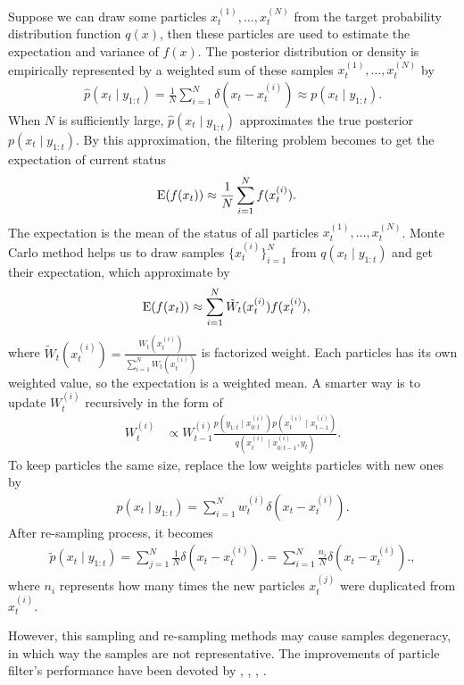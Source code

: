 Suppose we can draw some particles $x_t^{(1)}, \ldots, x_t^{(N)}$ from the target probability distribution function $q(x)$, then these particles are used to estimate the expectation and variance of $f(x)$. The posterior distribution or density is empirically represented by a weighted sum of these samples $x_t^{(1)}, \ldots, x_t^{(N)}$ by 
\begin{align*}
\hat{p}(x_t\mid y_{1:t})=\frac{1}{N}\sum_{i=1}^N\delta (x_t-x_t^{(i)})\approx p(x_t\mid y_{1:t}).
\end{align*}
When $N$ is sufficiently large, $\hat{p}(x_t\mid y_{1:t})$ approximates the true posterior $p(x_t\mid y_{1:t})$. By this approximation, the filtering problem becomes to get the expectation of current status
\begin{align*}
\mathrm{E}(f(x_t)) &\approx \frac{1}{N}\sum_{i=1}^Nf(x_t^{(i)}).
\end{align*}
The expectation is the mean of the status of all particles $x_t^{(1)}, \ldots, x_t^{(N)}$. Monte Carlo method helps us to draw samples $\{x_t^{(i)}\}_{i=1}^N$ from $q(x_t\mid y_{1:t})$ and get their expectation, which approximate by
\begin{align*}
\mathrm{E}(f(x_t)) &\approx \sum_{i=1}^{N} \tilde{W}_t(x_t^{(i)})f(x_t^{(i)}),
\end{align*}
where $\tilde{W}_t(x_t^{(i)}) = \frac{ W_t(x_t^{(i)})}{\sum_{i=1}^NW_t(x_t^{(i)})}$ is factorized weight. Each particles has its own weighted value, so the expectation is a weighted mean. A smarter way is to update $W_t^{(i)}$ recursively in the form of
\begin{align*}
W_t^{(i)} &\propto W_{t-1}^{(i)} \frac{ p(y_{1:t}\mid x_{0:t}^{(i)}) p(x_{t}^{(i)}\mid x_{t-1}^{(i)}) }   {q(x_{t}^{(i)}\mid x_{0:t-1}^{(i)},y_{t})}.
\end{align*}
To keep particles the same size, replace the low weights particles with new ones by 
\begin{align*}
p(x_t\mid y_{1:t})=\sum_{i=1}^Nw_t^{(i)} \delta (x_t-x_t^{(i)}).
\end{align*}
After re-sampling process, it becomes
\begin{align*}
\tilde{p}(x_t\mid y_{1:t})=\sum_{j=1}^N\frac{1}{N} \delta (x_t-x_t^{(i)}).= \sum_{i=1}^N\frac{n_i}{N}\delta (x_t-x_t^{(i)}).,
\end{align*}
where $n_i$ represents how many times the new particles $x_t^{(j)}$ were duplicated from $x_t^{(i)}$. 


However, this sampling and re-sampling methods may cause samples degeneracy, in which way the samples are not representative. The improvements of particle filter's performance have been devoted by \cite{carpenter1999improved}, \cite{godsill2001maximum}, \cite{stavropoulos2001improved}, \cite{smcmip2011}. 


